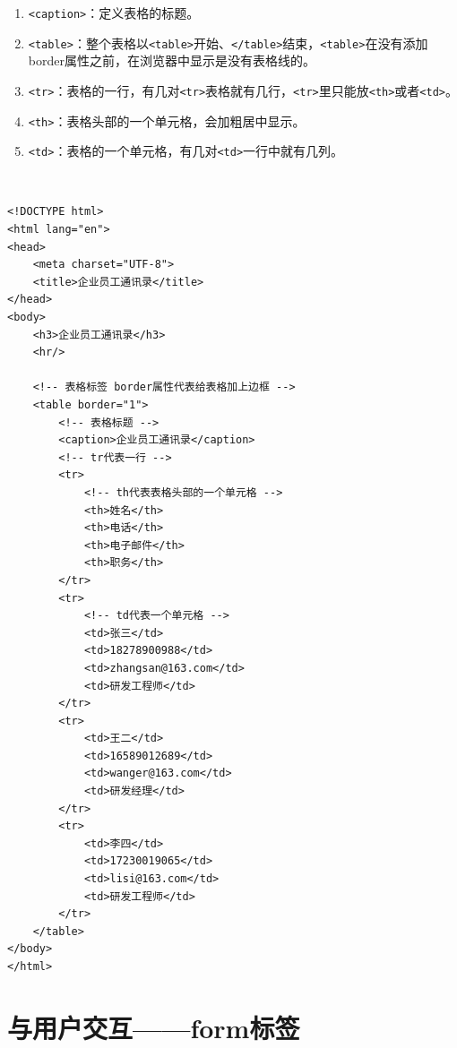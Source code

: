 \begin{enumerate}
    \item \lstinline|<caption>|：定义表格的标题。

    \item \lstinline|<table>|：整个表格以\lstinline|<table>|开始、\lstinline|</table>|结束，\lstinline|<table>|在没有添加border属性之前，在浏览器中显示是没有表格线的。

    \item \lstinline|<tr>|：表格的一行，有几对\lstinline|<tr>|表格就有几行，\lstinline|<tr>|里只能放\lstinline|<th>|或者\lstinline|<td>|。

    \item \lstinline|<th>|：表格头部的一个单元格，会加粗居中显示。

    \item \lstinline|<td>|：表格的一个单元格，有几对\lstinline|<td>|一行中就有几列。
\end{enumerate}

 \\
\begin{lstlisting}[style=htmlcssjs]
<!DOCTYPE html>
<html lang="en">
<head>
    <meta charset="UTF-8">
    <title>企业员工通讯录</title>
</head>
<body>
    <h3>企业员工通讯录</h3>
    <hr/>

    <!-- 表格标签 border属性代表给表格加上边框 -->
    <table border="1">
        <!-- 表格标题 -->
        <caption>企业员工通讯录</caption>
        <!-- tr代表一行 -->
        <tr>
            <!-- th代表表格头部的一个单元格 -->
            <th>姓名</th>
            <th>电话</th>
            <th>电子邮件</th>
            <th>职务</th>
        </tr>
        <tr>
            <!-- td代表一个单元格 -->
            <td>张三</td>
            <td>18278900988</td>
            <td>zhangsan@163.com</td>
            <td>研发工程师</td>
        </tr>
        <tr>
            <td>王二</td>
            <td>16589012689</td>
            <td>wanger@163.com</td>
            <td>研发经理</td>
        </tr>
        <tr>
            <td>李四</td>
            <td>17230019065</td>
            <td>lisi@163.com</td>
            <td>研发工程师</td>
        </tr>
    </table>
</body>
</html>
\end{lstlisting}

\newpage

\section{与用户交互——form标签}

